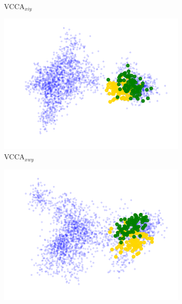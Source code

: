 \begin{figure}[t]
\begin{subfigure}[b]{0.3\textwidth}
         \caption{VCCA$_{x i y}$}
         \label{fig:pca_vcca_xiy_juice_yoghurt}
     \end{subfigure} 
     \begin{subfigure}[b]{0.3\textwidth}
         \centering
         \includegraphics[width=\textwidth]{PaperB/figures_and_tables/latent_space_visualizations/juice_yoghurt_new/pca_latent_juice_yoghurt_vcca_xwy_seed2.png}
         \caption{VCCA$_{x w y}$}
         \label{fig:pca_vcca_xwy_juice_yoghurt}
     \end{subfigure} 
     \begin{subfigure}[b]{0.3\textwidth}
         \centering
         \includegraphics[width=\textwidth]{PaperB/figures_and_tables/latent_space_visualizations/juice_yoghurt_new/pca_latent_juice_yoghurt_vcca_xiwy_seed2.png}

\end{subfigure}
\end{figure}
